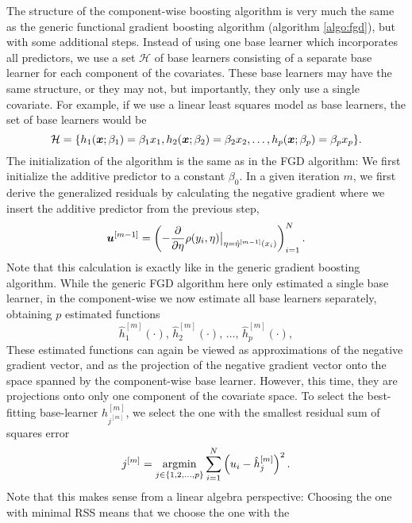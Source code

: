 The structure of the component-wise boosting algorithm is very much the same as the generic functional gradient boosting algorithm (algorithm \ref{algo:fgd}), but with some additional steps.
Instead of using one base learner which incorporates all predictors,
we use a set $\mathcal{H}$ of base learners consisting of a separate base learner for each component of the covariates.
These base learners may have the same structure, or they may not, but importantly, they only use a single covariate.
For example, if we use a linear least squares model as base 
learners, the set of base learners would be
\begin{equation}
    \mathcal{H}=\{h_1(\bm{x};\beta_1)=\beta_1 x_1,h_2(\bm{x};\beta_2)=\beta_2 x_2,\ldots,h_p(\bm{x};\beta_p)=\beta_p x_p \}.
\end{equation}
The initialization of the algorithm is the same as in the FGD algorithm:
We first initialize the additive predictor to a constant $\beta_0$.
In a given iteration $m$, we first derive the generalized residuals by calculating 
the negative gradient where we insert the additive predictor from the previous step,
\begin{equation}
    \bm{u}^{[m-1]}=\left(-\frac{\partial}{\partial \eta}\rho(y_i, \eta)\big\rvert_{\eta=\hat{\eta}^{[m-1]}(x_i)}\right)_{i=1}^N.
\end{equation}
Note that this calculation is exactly like in the generic gradient boosting algorithm.
While the generic FGD algorithm here only estimated a single base learner, in the component-wise we now estimate all base learners separately, obtaining $p$ estimated functions
\begin{equation}
    \hat{h}_1^{[m]}(\cdot),\,\hat{h}_2^{[m]}(\cdot),\,\ldots,\,\hat{h}_p^{[m]}(\cdot),
\end{equation}
These estimated functions can again be viewed as approximations of the negative gradient vector, and as the projection of the negative gradient vector onto the space spanned by the component-wise base learner. However, this time, they are projections onto
only one component of the covariate space. To select the best-fitting base-learner $h_{j^{[m]}}^{[m]}$, we select the one with
the smallest residual sum of squares error
\begin{equation}
    j^{[m]}=\operatorname*{argmin}_{j\in\{1,2,\ldots,p\}}\sum_{i=1}^N \left(u_i-\hat{h}_j^{[m]}\right)^2.
\end{equation}
Note that this makes sense from a linear algebra perspective: Choosing the one with minimal RSS means that we choose the one with the
